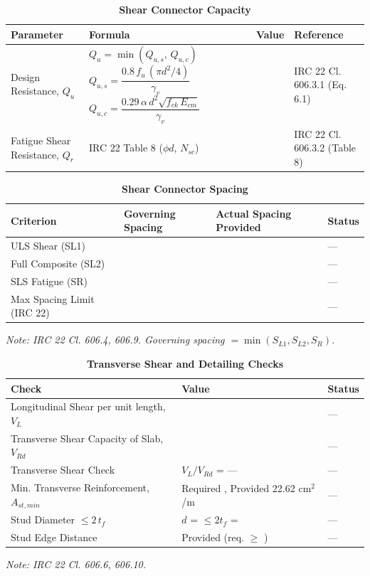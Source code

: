 \documentclass[12pt,a4paper]{report}
\numberwithin{table}{chapter}
\numberwithin{figure}{chapter}
\begin{document}
\vspace{1em}

\begin{longtable}{|L{3.6cm}|C{5.6cm}|>{\centering\arraybackslash}p{2.6cm}|L{3.0cm}|}
\caption{\textbf{Shear Connector Capacity}}
\hline
\textbf{Parameter} & \textbf{Formula} & \textbf{Value} & \textbf{Reference} \\[6pt]
\hline
Design Resistance, $Q_u$ & \footnotesize{} &  & IRC 22 Cl. 606.3.1 (Eq. 6.1) \\[6pt]
\hline
Fatigue Shear Resistance, $Q_r$ & IRC 22 Table 8 ($\phi d$, $N_{sc}$) &  & IRC 22 Cl. 606.3.2 (Table 8) \\[6pt]
\hline
\end{longtable}

\vspace{1em}

\setlength\LTleft{0pt}
\setlength\LTright{\fill}

\begin{longtable}{|L{3.2cm}|>{\centering\arraybackslash}p{4.3cm}|>{\centering\arraybackslash}p{4.3cm}|C{2.0cm}|}
\caption{\textbf{Shear Connector Spacing}}
\hline
\textbf{Criterion} & \textbf{Governing Spacing} & \textbf{Actual Spacing Provided} & \textbf{Status} \\[6pt]
\hline
ULS Shear (SL1) &  &  & --- \\[6pt]
\hline
Full Composite (SL2) &  &  & --- \\[6pt]
\hline
SLS Fatigue (SR) &  &  & --- \\[6pt]
\hline
Max Spacing Limit (IRC 22) &  &  & --- \\[6pt]
\hline
\end{longtable}
\noindent\textit{Note: IRC 22 Cl. 606.4, 606.9. Governing spacing $= \min(S_{L1}, S_{L2}, S_R)$.}

\vspace{1em}
\begin{longtable}{|L{5.3cm}|>{\arraybackslash}p{7.2cm}|C{2.0cm}|}
\caption{\textbf{Transverse Shear and Detailing Checks}}
\hline
\textbf{Check} & \textbf{Value} & \textbf{Status} \\[6pt]
\hline
\textnormal{Longitudinal Shear per unit length, $V_L$} &  & --- \\[6pt]
\hline
\textnormal{Transverse Shear Capacity of Slab, $V_{Rd}$} &  & --- \\[6pt]
\hline
\textnormal{Transverse Shear Check} & $V_L/V_{Rd}$ = --- & --- \\[6pt]
\hline
\textnormal{Min. Transverse Reinforcement, $A_{st,min}$} & Required , Provided 22.62 cm$^2$/m & --- \\[6pt]
\hline
\textnormal{Stud Diameter $\leq 2\,t_f$} & $d$ =  $\leq 2t_f$ =  & --- \\[6pt]
\hline
\textnormal{Stud Edge Distance} & Provided  (req. $\geq$ ) & --- \\[6pt]
\hline
\end{longtable}
\noindent\textit{Note: IRC 22 Cl. 606.6, 606.10.}
\end{document}
